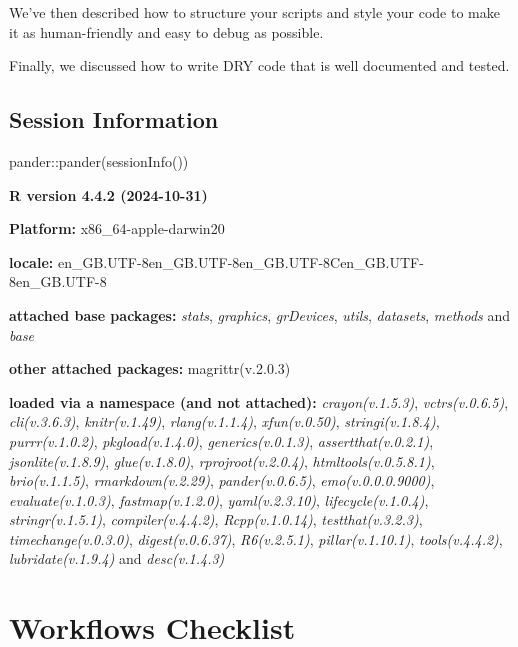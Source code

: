 \documentclass[
  letterpaper,
  DIV=11,
  numbers=noendperiod]{scrreprt}
\newenvironment{Shaded}{\begin{snugshade}}{\end{snugshade}}
\newcommand{\FunctionTok}[1]{\textcolor[rgb]{0.28,0.35,0.67}{#1}}
\newcommand{\NormalTok}[1]{\textcolor[rgb]{0.00,0.23,0.31}{#1}}
\newcommand{\SpecialCharTok}[1]{\textcolor[rgb]{0.37,0.37,0.37}{#1}}
\begin{document}
We've then described how to structure your scripts and style your code
to make it as human-friendly and easy to debug as possible.

Finally, we discussed how to write DRY code that is well documented and
tested.

\section{Session Information}\label{session-information-2}

\begin{Shaded}
\begin{Highlighting}[]
\NormalTok{pander}\SpecialCharTok{::}\FunctionTok{pander}\NormalTok{(}\FunctionTok{sessionInfo}\NormalTok{())}
\end{Highlighting}
\end{Shaded}

\textbf{R version 4.4.2 (2024-10-31)}

\textbf{Platform:} x86\_64-apple-darwin20

\textbf{locale:}
en\_GB.UTF-8\textbar\textbar en\_GB.UTF-8\textbar\textbar en\_GB.UTF-8\textbar\textbar C\textbar\textbar en\_GB.UTF-8\textbar\textbar en\_GB.UTF-8

\textbf{attached base packages:} \emph{stats}, \emph{graphics},
\emph{grDevices}, \emph{utils}, \emph{datasets}, \emph{methods} and
\emph{base}

\textbf{other attached packages:} magrittr(v.2.0.3)

\textbf{loaded via a namespace (and not attached):}
\emph{crayon(v.1.5.3)}, \emph{vctrs(v.0.6.5)}, \emph{cli(v.3.6.3)},
\emph{knitr(v.1.49)}, \emph{rlang(v.1.1.4)}, \emph{xfun(v.0.50)},
\emph{stringi(v.1.8.4)}, \emph{purrr(v.1.0.2)}, \emph{pkgload(v.1.4.0)},
\emph{generics(v.0.1.3)}, \emph{assertthat(v.0.2.1)},
\emph{jsonlite(v.1.8.9)}, \emph{glue(v.1.8.0)},
\emph{rprojroot(v.2.0.4)}, \emph{htmltools(v.0.5.8.1)},
\emph{brio(v.1.1.5)}, \emph{rmarkdown(v.2.29)}, \emph{pander(v.0.6.5)},
\emph{emo(v.0.0.0.9000)}, \emph{evaluate(v.1.0.3)},
\emph{fastmap(v.1.2.0)}, \emph{yaml(v.2.3.10)},
\emph{lifecycle(v.1.0.4)}, \emph{stringr(v.1.5.1)},
\emph{compiler(v.4.4.2)}, \emph{Rcpp(v.1.0.14)},
\emph{testthat(v.3.2.3)}, \emph{timechange(v.0.3.0)},
\emph{digest(v.0.6.37)}, \emph{R6(v.2.5.1)}, \emph{pillar(v.1.10.1)},
\emph{tools(v.4.4.2)}, \emph{lubridate(v.1.9.4)} and
\emph{desc(v.1.4.3)}

\chapter*{Workflows Checklist}\label{workflows-checklist}
\end{document}
